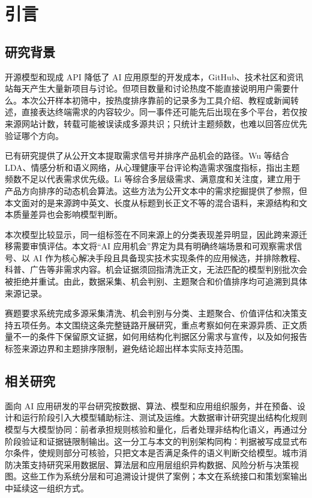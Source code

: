 \section{引言}

\subsection{研究背景}

开源模型和现成 API 降低了 AI 应用原型的开发成本，GitHub、技术社区和资讯站每天产生大量新项目与讨论。但项目数量和讨论热度不能直接说明用户需要什么。本次公开样本初筛中，按热度排序靠前的记录多为工具介绍、教程或新闻转述，直接表达终端需求的内容较少。同一事件还可能先后出现在多个平台，若仅按来源网站计数，转载可能被误读成多源共识；只统计主题频数，也难以回答应优先验证哪个方向。

已有研究提供了从公开文本提取需求信号并排序产品机会的路径。Wu 等结合 LDA、情感分析和语义网络，从心理健康平台评论构造需求强度指标，指出主题频数不足以代表需求优先级\cite{wu2026needs}。Li 等综合多层级需求、满意度和关注度，建立用于产品方向排序的动态机会算法\cite{li2026productopportunity}。这些方法为公开文本中的需求挖掘提供了参照，但本文面对的是来源跨中英文、长度从标题到长正文不等的混合语料，来源结构和文本质量差异也会影响模型判断。

本次模型比较显示，同一组标签在不同来源上的分类表现差异明显，因此跨来源迁移需要审慎评估。本文将“AI 应用机会”界定为具有明确终端场景和可观察需求信号、以 AI 作为核心解决手段且具备现实技术实现条件的应用候选，并排除教程、科普、广告等非需求内容。机会证据须回指清洗正文，无法匹配的模型判别批次会被拒绝并重试。由此，数据采集、机会判别、主题聚合和价值排序均可追溯到具体来源记录。

赛题要求系统完成多源采集清洗、机会判别与分类、主题聚合、价值评估和决策支持五项任务。本文围绕这条完整链路开展研究，重点考察如何在来源异质、正文质量不一的条件下保留原文证据，如何用结构化判据区分需求与宣传，以及如何报告标签来源边界和主题排序限制，避免结论超出样本实际支持范围。

\subsection{相关研究}

面向 AI 应用研发的平台研究按数据、算法、模型和应用组织服务，并在预备、设计和运行阶段引入大模型辅助标注、测试及运维\cite{liang2025platform}。大数据审计研究提出结构化规则模型与大模型协同：前者承担规则核验和量化，后者处理非结构化语义，再通过分阶段验证和证据链限制输出\cite{xu2025audit}。这一分工与本文的判别架构同构：判据被写成显式布尔条件，使规则部分可核验，只把文本是否满足条件的语义判断交给模型。城市消防决策支持研究采用数据层、算法层和应用层组织异构数据、风险分析与决策视图\cite{zhang2025fire}。这些工作为系统分层和可追溯设计提供了案例；本文在系统接口和策划案输出中延续这一组织方式\cite{liang2025platform,xu2025audit,zhang2025fire}。

